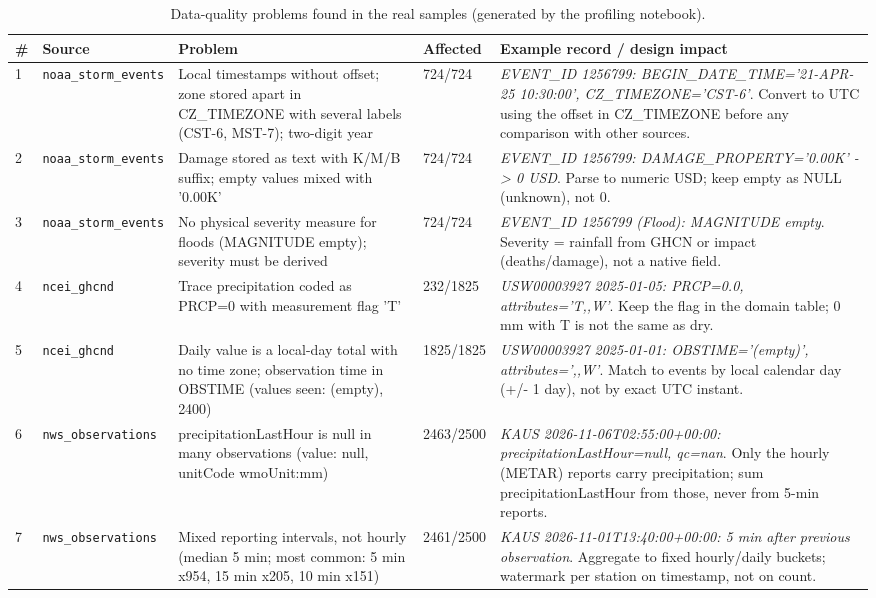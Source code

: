 {\small
\begin{longtable}{@{}>{\raggedright}p{0.4cm}>{\raggedright}p{2.5cm}>{\raggedright}p{4.2cm}>{\raggedright}p{1.5cm}p{6.2cm}@{}}
\caption{Data-quality problems found in the real samples (generated by the profiling notebook).}\label{tab:dq}\\
\toprule \# & Source & Problem & Affected & Example record / design impact\\ \midrule \endhead
1 & \texttt{noaa\_\allowbreak storm\_\allowbreak events} & Local timestamps without offset; zone stored apart in CZ\_TIMEZONE with several labels (CST-6, MST-7); two-digit year & 724/724 & \textit{EVENT\_ID 1256799: BEGIN\_DATE\_TIME='21-APR-25 10:30:00', CZ\_TIMEZONE='CST-6'}. Convert to UTC using the offset in CZ\_TIMEZONE before any comparison with other sources.\\
2 & \texttt{noaa\_\allowbreak storm\_\allowbreak events} & Damage stored as text with K/M/B suffix; empty values mixed with '0.00K' & 724/724 & \textit{EVENT\_ID 1256799: DAMAGE\_PROPERTY='0.00K' -> 0 USD}. Parse to numeric USD; keep empty as NULL (unknown), not 0.\\
3 & \texttt{noaa\_\allowbreak storm\_\allowbreak events} & No physical severity measure for floods (MAGNITUDE empty); severity must be derived & 724/724 & \textit{EVENT\_ID 1256799 (Flood): MAGNITUDE empty}. Severity = rainfall from GHCN or impact (deaths/damage), not a native field.\\
4 & \texttt{ncei\_\allowbreak ghcnd} & Trace precipitation coded as PRCP=0 with measurement flag 'T' & 232/1825 & \textit{USW00003927 2025-01-05: PRCP=0.0, attributes='T,,W'}. Keep the flag in the domain table; 0 mm with T is not the same as dry.\\
5 & \texttt{ncei\_\allowbreak ghcnd} & Daily value is a local-day total with no time zone; observation time in OBSTIME (values seen: (empty), 2400) & 1825/1825 & \textit{USW00003927 2025-01-01: OBSTIME='(empty)', attributes=',,W'}. Match to events by local calendar day (+/- 1 day), not by exact UTC instant.\\
6 & \texttt{nws\_\allowbreak observations} & precipitationLastHour is null in many observations (value: null, unitCode wmoUnit:mm) & 2463/2500 & \textit{KAUS 2026-11-06T02:55:00+00:00: precipitationLastHour=null, qc=nan}. Only the hourly (METAR) reports carry precipitation; sum precipitationLastHour from those, never from 5-min reports.\\
7 & \texttt{nws\_\allowbreak observations} & Mixed reporting intervals, not hourly (median 5 min; most common: 5 min x954, 15 min x205, 10 min x151) & 2461/2500 & \textit{KAUS 2026-11-01T13:40:00+00:00: 5 min after previous observation}. Aggregate to fixed hourly/daily buckets; watermark per station on timestamp, not on count.\\

\end{longtable}}
